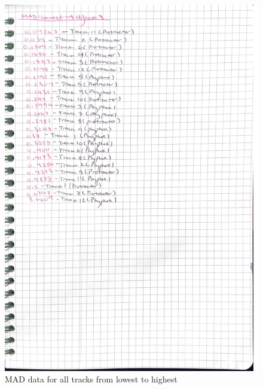 \documentclass[idxtotoc,hyperref,openany]{labbook} %
\begin{document}
\begin{figure}[H] %
\begin{center}
\includegraphics[width=0.9\linewidth]{images/Lab.01/PhyProMADLH.png}
\end{center}
\caption{MAD data for all tracks from lowest to highest}
\label{fig:MADLHPhyphoxProtractor}
\end{figure}

\end{document}
